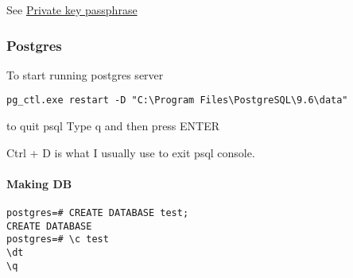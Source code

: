 See
\href{https://serverfault.com/questions/50775/how-do-i-change-my-private-key-passphrase}{Private key passphrase}


\subsubsection{Postgres}\label{postgres}

To start running postgres server

\begin{verbatim}
pg_ctl.exe restart -D "C:\Program Files\PostgreSQL\9.6\data"
\end{verbatim}

to quit psql Type q and then press ENTER

Ctrl + D is what I usually use to exit psql console.


\paragraph{Making DB}\label{making-db}

\begin{verbatim}
postgres=# CREATE DATABASE test;
CREATE DATABASE
postgres=# \c test 
\dt 
\q
\end{verbatim}



